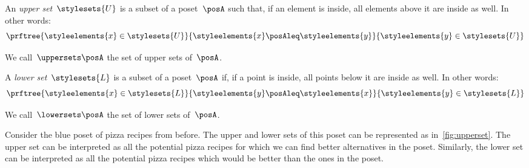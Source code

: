 \begin{definition}
  \label{def:upperset}
  An \emph{upper set}~$\stylesets{U}$ is a subset of a poset~$\posA$ such
  that, if an element is inside, all elements above it are inside as well. In other words:
  \begin{equation}
    \prftree{\styleelements{x}\in \stylesets{U}}{\styleelements{x}\posAleq \styleelements{y}}{\styleelements{y}\in \stylesets{U}}
  \end{equation}
\end{definition}
We call~$\uppersets \posA$ the set of upper sets of~$\posA$.

\begin{definition}
  \label{def:lowerset}
  A \emph{lower set}~$\stylesets{L}$ is a subset of a poset~$\posA$ if, if a point is inside, all points below it are inside as well.
  In other words:
  \begin{equation}
    \prftree{\styleelements{x}\in \stylesets{L}}{\styleelements{y}\posAleq \styleelements{x}}{\styleelements{y}\in \stylesets{L}}
  \end{equation}
\end{definition}
We call~$\lowersets \posA$ the set of lower sets of~$\posA$.
%

Consider the blue poset of pizza recipes from before. The upper and lower sets of this poset can be represented as in~\cref{fig:upperset}. The upper set can be interpreted as all the potential pizza recipes for which we can find better alternatives in the poset. Similarly, the lower set can be interpreted as all the potential pizza recipes which would be better than the ones in the poset.

